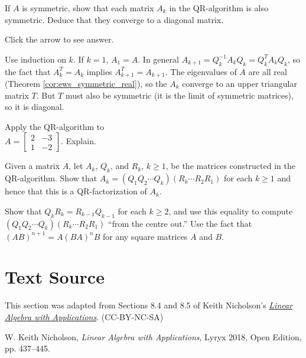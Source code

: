 \documentclass{ximera}
\begin{document}
\begin{problem}\label{prob:QR-symmetric}
If $A$ is symmetric, show that each matrix $A_{k}$ in the QR-algorithm is also symmetric. Deduce that they converge to a diagonal matrix.

Click the arrow to see answer.
\begin{expandable}{}{}
Use induction on $k$. If $k = 1$, $A_{1} = A$. In general $A_{k+1} = Q_{k}^{-1}A_{k}Q_{k} = Q_{k}^{T}A_{k}Q_{k}$, so the fact that $A_{k}^{T} = A_{k}$ implies $A_{k+1}^{T} = A_{k+1}$. The eigenvalues of $A$ are all real (Theorem \ref{cor:ews_symmetric_real}), so the $A_{k}$ converge to an upper triangular matrix $T$. But $T$ must also be symmetric (it is the limit of symmetric matrices), so it is diagonal.
\end{expandable}
\end{problem}

\begin{problem}\label{QR-special-2x2}
Apply the QR-algorithm to \\ $A = \left[ \begin{array}{rr}
2 & -3 \\
1 & -2
\end{array}\right]$. Explain.
\end{problem}

\begin{problem}\label{prob:analyzeQRalgorithm}
Given a matrix $A$, let $A_{k}$, $Q_{k}$, and $R_{k}$, $k \geq 1$, be the matrices constructed in the QR-algorithm. Show that $A_{k} = (Q_{1}Q_{2} \cdots Q_{k})(R_{k} \cdots R_{2}R_{1})$ for each $k \geq 1$ and hence that this is a QR-factorization of $A_{k}$. 
\begin{hint}
Show that $Q_{k}R_{k} = R_{k-1}Q_{k-1}$ for each $k \geq 2$, and use this equality to compute $(Q_{1}Q_{2} \cdots Q_{k})(R_{k} \cdots R_{2}R_{1})$ ``from the centre out.'' Use the fact that $(AB)^{n+1} = A(BA)^{n}B$ for any square matrices $A$ and $B$.
\end{hint}
\end{problem}

\section*{Text Source} This section was adapted from Sections 8.4 and 8.5 of Keith Nicholson's \href{https://open.umn.edu/opentextbooks/textbooks/linear-algebra-with-applications}{\it Linear Algebra with Applications}. (CC-BY-NC-SA)

W. Keith Nicholson, {\it Linear Algebra with Applications}, Lyryx 2018, Open Edition, pp. 437--445.
\end{document}
